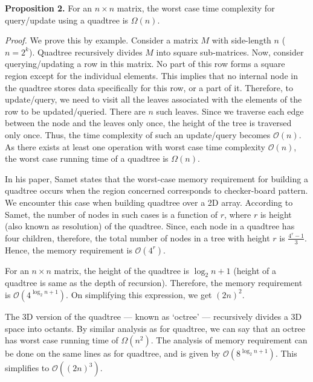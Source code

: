 \documentclass[a4paper]{article}
\begin{document}
\vspace{2 mm}
\noindent
\textbf{Proposition 2.} For an $n \times n$ matrix, the worst case time complexity for query/update using a quadtree is $\Omega(n)$.

\vspace{1 mm}
\noindent
\textit{Proof.} We prove this by example. Consider a matrix $M$ with side-length $n$ ($n=2^k$). Quadtree recursively divides $M$ into square sub-matrices. Now, consider querying/updating a row in this matrix. No part of this row forms a square region except for the individual elements. This implies that no internal node in the quadtree stores data specifically for this row, or a part of it. Therefore, to update/query, we need to visit all the leaves associated with the elements of the row to be updated/queried. There are $n$ such leaves. Since we traverse each edge between the node and the leaves only once, the height of the tree is traversed only once. Thus, the time complexity of such an update/query becomes $\mathcal{O}(n)$. As there exists at least one operation with worst case time complexity $\mathcal{O}(n)$, the worst case running time of a quadtree is $\Omega(n)$.

\vspace{2 mm}
In his paper\cite[p. 240]{HS2}, Samet states that the worst-case memory requirement for building a quadtree occurs when the region concerned corresponds to checker-board pattern. We encounter this case when building quadtree over a 2D array. According to Samet, the number of nodes in such cases is a function of $r$, where $r$ is height (also known as resolution) of the quadtree. Since, each node in a quadtree has four children, therefore, the total number of nodes in a tree with height $r$ is $\frac{4^{r}-1}{3}$.\cite{QTN} Hence, the memory requirement is $\mathcal{O}(4^{r})$.

\vspace{2 mm}
For an $n \times n$ matrix, the height of the quadtree is $\log_2 n +1$ (height of a quadtree is same as the depth of recursion\cite[p. 2--3]{QTN}). Therefore, the memory requirement is $\mathcal{O}(4^{\log_2 n + 1})$. On simplifying this expression, we get $(2n)^2$.

The 3D version of the quadtree --- known as `octree' --- recursively divides a 3D space into octants. By similar analysis as for quadtree, we can say that an octree has worst case running time of $\Omega(n^2)$. The analysis of memory requirement can be done on the same lines as for quadtree, and is given by $\mathcal{O}(8^{\log_2 n + 1})$. This simplifies to $\mathcal{O}((2n)^3)$. 
\end{document}
